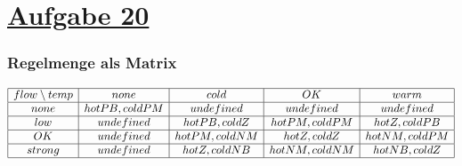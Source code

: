 \section*{\underline{Aufgabe 20}}


\subsubsection*{Regelmenge als Matrix}

$\begin{array}{|c|c|c|c|c|}
\hline
flow \setminus temp & none            & cold            & OK & warm \\
\hline
none                & hot PB, cold PM & undefined       & undefined & undefined \\
\hline
low                 & undefined       & hot PB, cold Z  & hot PM, cold PM & hot Z , cold PB \\
\hline
OK                  & undefined       & hot PM, cold NM & hot Z , cold Z  & hot NM, cold PM \\
\hline
strong              & undefined       & hot Z , cold NB & hot NM, cold NM & hot NB, cold Z \\
\hline
\end{array} $
